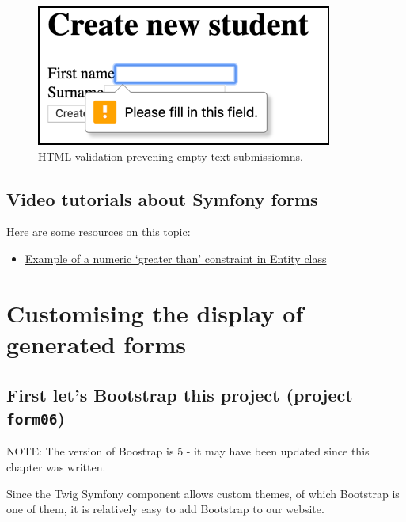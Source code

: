 \documentclass[a4paperpaper,openright]{book}
\providecommand{\tightlist}{%
  \setlength{\itemsep}{0pt}\setlength{\parskip}{0pt}}
\begin{document}
\begin{figure}
\centering
\includegraphics{./tex2pdf.-51e064f4751cea0e/ca3a96067d2a7b1d92cc60f542cb170bf7dc8563.png}
\caption{HTML validation prevening empty text submissiomns.
\label{html_validation}}
\end{figure}

\hypertarget{video-tutorials-about-symfony-forms}{%
\section{Video tutorials about Symfony
forms}\label{video-tutorials-about-symfony-forms}}

Here are some resources on this topic:

\begin{itemize}
\tightlist
\item
  \href{https://symfony.com/doc/current/reference/constraints/GreaterThan.html}{Example
  of a numeric `greater than' constraint in Entity class}
\end{itemize}

\hypertarget{customising-the-display-of-generated-forms}{%
\chapter{Customising the display of generated
forms}\label{customising-the-display-of-generated-forms}}

\hypertarget{first-lets-bootstrap-this-project-project-form06}{%
\section{\texorpdfstring{First let's Bootstrap this project (project
\texttt{form06})}{First let's Bootstrap this project (project form06)}}\label{first-lets-bootstrap-this-project-project-form06}}

NOTE: The version of Boostrap is 5 - it may have been updated since this
chapter was written.

Since the Twig Symfony component allows custom themes, of which
Bootstrap is one of them, it is relatively easy to add Bootstrap to our
website.
\end{document}
